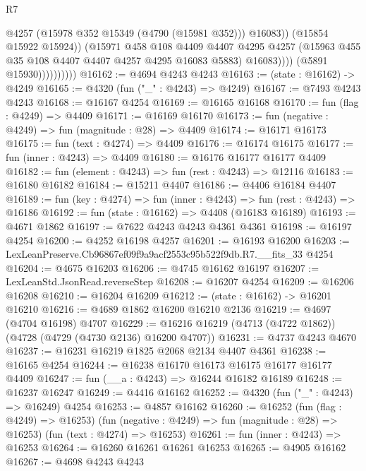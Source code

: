 \begin{lexlean}{R7}
\begin{coremodule}
                                  @4257
                                  (@15978 @352 @15349 (@4790 (@15981 @352)))
                                  @16083))
                              (@15854 @15922 @15924))
                            (@15971
                              @458
                              @108
                              @4409
                              @4407
                              @4295
                              @4257
                              (@15963 @455 @35 @108 @4407 @4407 @4257 @4295 @16083 @5883)
                              @16083))))
                      (@5891 @15930))))))))))
@16162 := @4694 @4243 @4243
@16163 := (state : @16162) -> @4249
@16165 := @4320 (fun ("_" : @4243) => @4249)
@16167 := @7493 @4243 @4243
@16168 := @16167 @4254
@16169 := @16165 @16168
@16170 := fun (flag : @4249) => @4409
@16171 := @16169 @16170
@16173 := fun (negative : @4249) => fun (magnitude : @28) => @4409
@16174 := @16171 @16173
@16175 := fun (text : @4274) => @4409
@16176 := @16174 @16175
@16177 := fun (inner : @4243) => @4409
@16180 := @16176 @16177 @16177 @4409
@16182 := fun (element : @4243) => fun (rest : @4243) => @12116
@16183 := @16180 @16182
@16184 := @15211 @4407
@16186 := @4406 @16184 @4407
@16189 := fun (key : @4274) => fun (inner : @4243) => fun (rest : @4243) => @16186
@16192 := fun (state : @16162) => @4408 (@16183 @16189)
@16193 := @4671 @1862
@16197 := @7622 @4243 @4243 @4361 @4361
@16198 := @16197 @4254
@16200 := @4252 @16198 @4257
@16201 := @16193 @16200
@16203 := LexLeanPreserve.Cb96867ef09f9a9acf2553c95b522f9db.R7.__fits_33 @4254
@16204 := @4675 @16203
@16206 := @4745 @16162 @16197
@16207 := LexLeanStd.JsonRead.reverseStep
@16208 := @16207 @4254
@16209 := @16206 @16208
@16210 := @16204 @16209
@16212 := (state : @16162) -> @16201 @16210
@16216 := @4689 @1862 @16200 @16210 @2136
@16219 := @4697 (@4704 @16198) @4707
@16229 := @16216 @16219 (@4713 (@4722 @1862)) (@4728 (@4729 (@4730 @2136) @16200 @4707))
@16231 := @4737 @4243 @4670
@16237 := @16231 @16219 @1825 @2068 @2134 @4407 @4361
@16238 := @16165 @4254
@16244 := @16238 @16170 @16173 @16175 @16177 @16177 @4409
@16247 := fun (__a : @4243) => @16244 @16182 @16189
@16248 := @16237 @16247
@16249 := @4416 @16162
@16252 := @4320 (fun ("_" : @4243) => @16249) @4254
@16253 := @4857 @16162
@16260 := @16252
    (fun (flag : @4249) => @16253)
    (fun (negative : @4249) => fun (magnitude : @28) => @16253)
    (fun (text : @4274) => @16253)
@16261 := fun (inner : @4243) => @16253
@16264 := @16260 @16261 @16261 @16253
@16265 := @4905 @16162
@16267 := @4698 @4243 @4243

\end{coremodule}
\end{lexlean}
